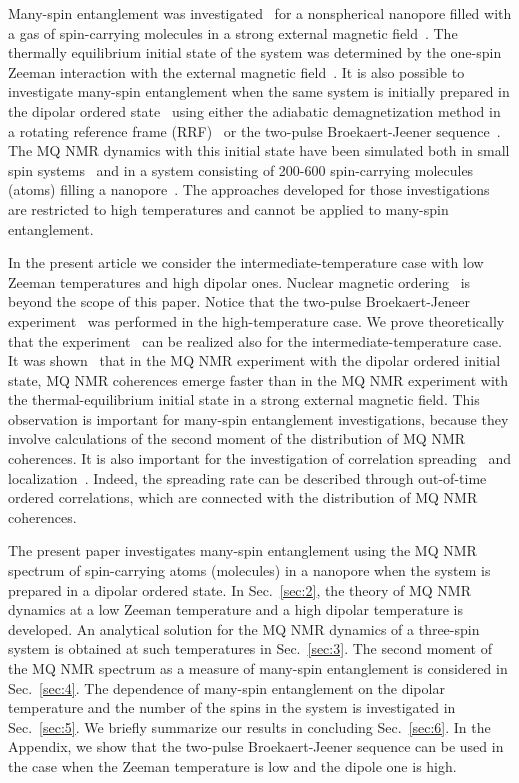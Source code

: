Many-spin entanglement was investigated~\cite{Doronin_2019} for a nonspherical nanopore filled with a gas of spin-carrying molecules in a strong external magnetic field~\cite{Baugh_2001,Doronin_2009}.
The thermally equilibrium initial state of the system was determined by the one-spin Zeeman interaction with the external magnetic field~\cite{Doronin_2007a}.
It is also possible to investigate many-spin entanglement when the same system is initially prepared in the dipolar ordered state~\cite{Goldman_1970} using either the adiabatic demagnetization method in a rotating reference frame (RRF)~\cite{Goldman_1970,Slichter_1961} or the two-pulse Broekaert-Jeener sequence~\cite{Goldman_1970,Jeener_1967}.
The MQ NMR dynamics with this initial state have been simulated both in small spin systems~\cite{Doronin_2007a,Doronin_2007b} and in a system consisting of 200-600 spin-carrying molecules (atoms) filling a nanopore~\cite{Doronin_2011}.
The approaches developed for those investigations are restricted to  high temperatures and cannot be applied to  many-spin entanglement.

In the present article we consider the intermediate-temperature case with low Zeeman temperatures and high dipolar ones.
Nuclear magnetic ordering~\cite{Abragam_1982} is beyond the scope of this paper.
Notice that the two-pulse Broekaert-Jeneer experiment~\cite{Jeener_1967} was performed in the high-temperature case.
We prove theoretically that the experiment~\cite{Jeener_1967} can be realized also for the intermediate-temperature case.
It was shown~\cite{Doronin_2011} that in the MQ NMR experiment with the dipolar ordered initial state, MQ NMR coherences emerge faster
than in the MQ NMR experiment with the thermal-equilibrium initial state in a strong external magnetic field.
This observation is important for many-spin entanglement investigations, because they involve calculations of the second moment of the distribution of MQ NMR coherences.
It is also important for the investigation of correlation spreading~\cite{Baugh_2001,Baum_1986,S_nchez_2014,Munowitz_1987} and localization~\cite{Alvarez_2015,Wei_2018}.
Indeed, the spreading rate can be described through out-of-time ordered correlations, which are connected with the distribution of MQ NMR coherences.

The present paper investigates many-spin entanglement using the MQ NMR spectrum of spin-carrying atoms (molecules) in a nanopore when the system is prepared in a dipolar ordered state.
In Sec.~\ref{sec:2}, the theory of MQ NMR dynamics at a low Zeeman temperature and a high dipolar temperature is developed.
An analytical solution for the MQ NMR dynamics of a three-spin system is obtained at such temperatures in Sec.~\ref{sec:3}.
The second moment of the MQ NMR spectrum as a measure of many-spin entanglement is considered in Sec.~\ref{sec:4}.
The dependence of many-spin entanglement on the dipolar temperature and the number of the spins in the system is investigated in Sec.~\ref{sec:5}.
We briefly summarize our results in concluding Sec.~\ref{sec:6}.
In the Appendix, we show that the two-pulse Broekaert-Jeener sequence can be used in the case when the Zeeman temperature is low and the dipole one is high.



